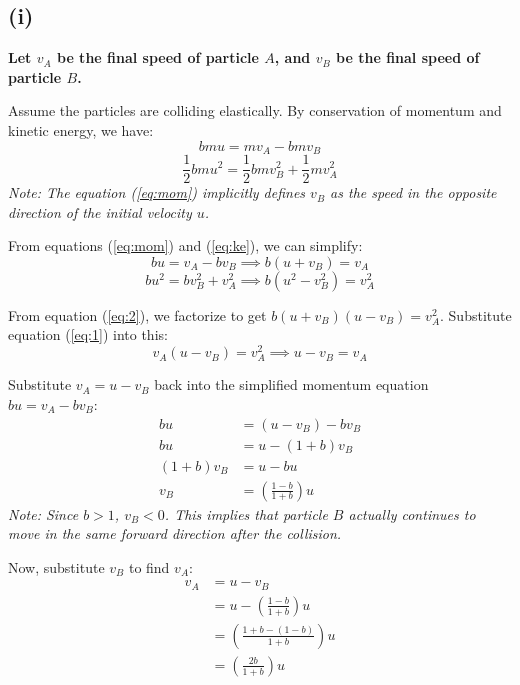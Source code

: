 ﻿\documentclass[12pt]{article}
\begin{document}
\subsection*{(i)}
\textbf{Let $v_A$ be the final speed of particle $A$, and $v_B$ be the final speed of particle $B$.}

Assume the particles are colliding elastically. By conservation of momentum and kinetic energy, we have:
\begin{equation}
    bmu = mv_A - bmv_B \label{eq:mom}
\end{equation}
\begin{equation}
    \frac{1}{2}bmu^2 = \frac{1}{2}bmv_B^2 + \frac{1}{2}mv_A^2 \label{eq:ke}
\end{equation}
\textit{Note: The equation (\ref{eq:mom}) implicitly defines $v_B$ as the speed in the opposite direction of the initial velocity $u$.\\}

From equations (\ref{eq:mom}) and (\ref{eq:ke}), we can simplify:
\begin{equation}
    bu = v_A - bv_B \implies b(u + v_B) = v_A \label{eq:1}
\end{equation}
\begin{equation}
    bu^2 = bv_B^2 + v_A^2 \implies b(u^2 - v_B^2) = v_A^2 \label{eq:2}
\end{equation}

From equation (\ref{eq:2}), we factorize to get $b(u+v_B)(u-v_B) = v_A^2$.
Substitute equation (\ref{eq:1}) into this:
\begin{equation*}
    v_A(u-v_B) = v_A^2 \implies u-v_B = v_A
\end{equation*}

Substitute $v_A = u - v_B$ back into the simplified momentum equation $bu = v_A - bv_B$:
\begin{align*}
    bu &= (u - v_B) - b v_B \\
    bu &= u - (1+b)v_B \\
    (1+b)v_B &= u - bu \\
    v_B &= \left(\frac{1-b}{1+b}\right)u
\end{align*}
\textit{Note: Since $b > 1$, $v_B < 0$. This implies that particle $B$ actually continues to move in the same forward direction after the collision.}

Now, substitute $v_B$ to find $v_A$:
\begin{align*}
    v_A &= u - v_B \\
    &= u - \left(\frac{1-b}{1+b}\right)u \\
    &= \left( \frac{1+b - (1-b)}{1+b} \right)u \\
    &= \left(\frac{2b}{1+b}\right)u
\end{align*}
\end{document}
